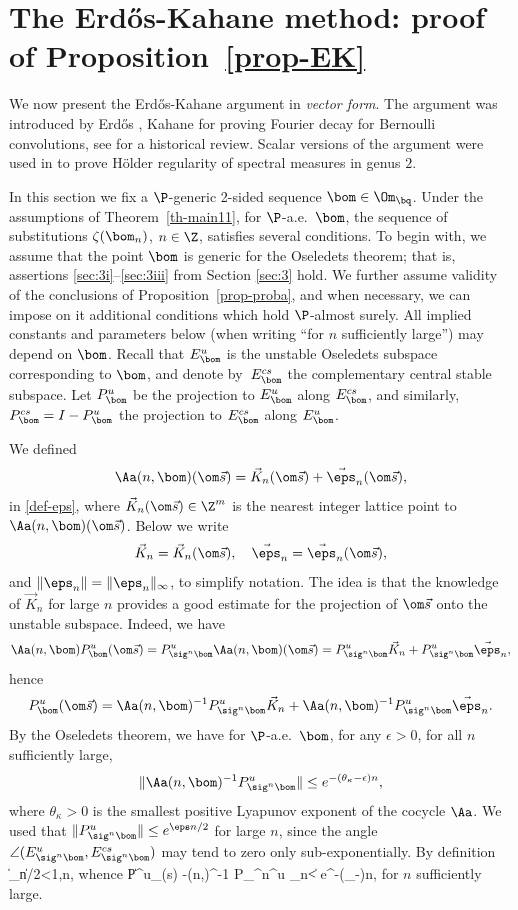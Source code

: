 \section{The Erd\H{o}s-Kahane method: proof of Proposition~\ref{prop-EK} }

We now present the Erd\H{o}s-Kahane argument in {\it vector form}. The argument was introduced by Erd\H{o}s \cite{Erd} , Kahane \cite{Kahane} for proving Fourier decay for Bernoulli convolutions, see \cite{sixty} for a historical review. Scalar versions of the argument were used in \cite{BuSol2,BuSo18a} to prove Hölder regularity of spectral measures in genus $2$.

In this section we fix a $\P$-generic 2-sided sequence $\bom\in \Om_\bq$.
Under the assumptions of Theorem~\ref{th-main11}, for $\P$-a.e.\ $\bom$, the sequence of substitutions $\zeta(\bom_n)$,
$n\in \Z$, satisfies several conditions.
To begin with, we assume that the point $\bom$ is generic for the Oseledets theorem; that is, assertions \eqref{sec:3i}--\eqref{sec:3iii} from Section \ref{sec:3} hold. We further assume validity of the conclusions
of Proposition~\ref{prop-proba}, and when necessary, we can impose on it additional conditions which hold $\P$-almost surely.
All implied constants and parameters below (\eg when writing ``for $n$ sufficiently large'') may depend on $\bom$.
Recall that $E^u_\bom$ is the unstable Oseledets subspace corresponding to $\bom$, and denote by~$E^{cs}_\bom$ the complementary central stable subspace. Let $P^u_\bom$ be the
projection to $E^u_\bom$ along $E^{cs}_\bom$, and similarly, $P^{cs}_\bom = I - P^u_\bom$ the projection to $E^{cs}_\bom$ along $E^u_\bom$.

We defined
\[
\Aa(n,\bom) (\om\vec s) = \vec{K}_n(\om\vec s) + \vec{\eps}_n(\om\vec s),
\]
in \eqref{def-eps}, where $\vec K_n(\om\vec s)\in \Z^m$ is the nearest integer lattice point to $\Aa(n,\bom) (\om\vec s)$. Below we write
\[
\vec K_n = \vec{K}_n(\om\vec s),\quad \vec\eps_n = \vec{\eps}_n(\om\vec s),
\]
and $\|\eps_n\| = \|\eps_n\|_\infty$,
to simplify notation.
The idea is that the knowledge of $\vec K_n$ for large $n$ provides a good estimate for the projection of $\om\vec s$ onto the unstable subspace. Indeed, we have
\[
\Aa(n,\bom) P_\bom^u(\om\vec s)=P_{\sig^n\bom}^u \Aa(n,\bom) (\om\vec s)= P_{\sig^n\bom}^u \vec{K}_n + P_{\sig^n\bom}^u \vec{\eps}_n,
\]
hence
\[
P^u_\bom(\om\vec s) = \Aa(n,\bom)^{-1} P_{\sig^n\bom}^u \vec{K}_n + \Aa(n,\bom)^{-1} P_{\sig^n\bom}^u \vec{\eps}_n.
\]
By the Oseledets theorem, we have for $\P$-a.e.\ $\bom$, for any $\epsilon>0$, for all $n$ sufficiently large,
\[
\|\Aa(n,\bom)^{-1}P^u_{\sig^n\bom}\|\le e^{-(\theta_\kappa-\epsilon)n},
\]
where $\theta_\kappa>0$ is the smallest positive Lyapunov exponent of the cocycle $\Aa$.
We used that $\|P^u_{\sig^n\bom}\|\le e^{\eps n/2}$ for large $n$, since the angle $\angle(E^u_{\sig^n\bom}, E^{cs}_{\sig^n\bom})$ may tend to zero only sub-exponentially.
By definition
\be \label{up1}
\|\vec{\eps}_n\|/2<1,\quad n,
\ee
whence
\be \label{good-est}
\|P^u_\bom(\om\vec s) -\Aa(n,\bom)^{-1} P_{\sig^n\bom}^u _n\| < e^{-(\theta_\kappa-\epsilon)n},
\ee
for $n$ sufficiently large.

